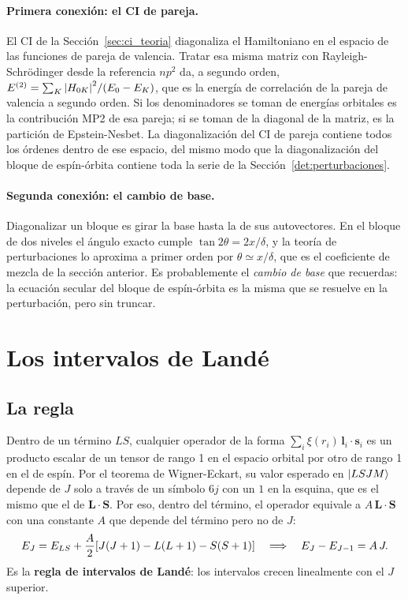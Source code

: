 \documentclass[11pt,a4paper]{article}
\begin{document}
\paragraph{Primera conexión: el CI de pareja.} El CI de la Sección~\ref{sec:ci_teoria}
diagonaliza el Hamiltoniano en el espacio de las funciones de pareja de valencia. Tratar esa misma
matriz con Rayleigh-Schrödinger desde la referencia $np^2$ da, a segundo orden,
$E^{(2)} = \sum_K \abs{H_{0K}}^2/(E_0 - E_K)$, que es la energía de correlación de la pareja de
valencia a segundo orden. Si los denominadores se toman de energías orbitales es la contribución
MP2 de esa pareja; si se toman de la diagonal de la matriz, es la partición de Epstein-Nesbet. La
diagonalización del CI de pareja contiene todos los órdenes dentro de ese espacio, del mismo modo
que la diagonalización del bloque de espín-órbita contiene toda la serie de la
Sección~\ref{det:perturbaciones}.

\paragraph{Segunda conexión: el cambio de base.} Diagonalizar un bloque es girar la base hasta
la de sus autovectores. En el bloque de dos niveles el ángulo exacto cumple
$\tan 2\theta = 2x/\delta$, y la teoría de perturbaciones lo aproxima a primer orden por
$\theta \simeq x/\delta$, que es el coeficiente de mezcla de la sección anterior. Es probablemente
el \emph{cambio de base} que recuerdas: la ecuación secular del bloque de espín-órbita es la misma
que se resuelve en la perturbación, pero sin truncar.

\section{Los intervalos de Landé}
\label{det:lande}

\subsection{La regla}

Dentro de un término $LS$, cualquier operador de la forma $\sum_i \xi(r_i)\,\mathbf{l}_i\cdot\mathbf{s}_i$
es un producto escalar de un tensor de rango 1 en el espacio orbital por otro de rango 1 en el de
espín. Por el teorema de Wigner-Eckart, su valor esperado en $\ket{LSJM}$ depende de $J$ solo a
través de un símbolo $6j$ con un $1$ en la esquina, que es el mismo que el de $\mathbf{L}\cdot\mathbf{S}$.
Por eso, dentro del término, el operador equivale a $A\,\mathbf{L}\cdot\mathbf{S}$ con una
constante $A$ que depende del término pero no de $J$:
\begin{equation}
  E_J = E_{LS} + \frac{A}{2}\qty[J(J+1) - L(L+1) - S(S+1)]
  \quad\Longrightarrow\quad E_J - E_{J-1} = A\,J .
\end{equation}
Es la \textbf{regla de intervalos de Landé}: los intervalos crecen linealmente con el $J$ superior.
\end{document}
